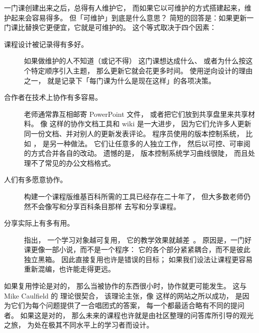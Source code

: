 
一门课创建出来之后，总得有人维护它，
而如果它以可维护的方式搭建起来，维护起来会容易得多。
但「可维护」到底是什么意思？
简短的回答是：如果更新一门课比替换它更便宜，它就是可维护的。
这个等式取决于四个因素：

\begin{description}

\item[课程设计被记录得有多好。]
  如果做维护的人不知道（或记不得）
  这门课想达成什么、
  或者为什么按这个特定顺序引入主题，
  那么更新它就会花更多时间。
  使用逆向设计的理由之一，
  就是记录下「每门课为什么是现在这样」的各项决策。

\item[合作者在技术上协作有多容易。]
  老师通常靠互相邮寄 PowerPoint 文件，
  或者把它们放到共享盘里来共享材料。
  像  这样的协作文档工具和 wiki
  是一大进步，
  因为它们允许多人更新同一份文档、并对别人的更新发表评论。
  程序员使用的版本控制系统，
  比如 ，
  是另一种做法。
  它们让任意多的人独立工作，
  然后以可控、可审阅的方式合并各自的改动。
  遗憾的是，
  版本控制系统学习曲线很陡，
  而且处理不了常见的办公文档格式。

\item[人们有多愿意协作。]
  构建一个课程版维基百科所需的工具已经存在二十年了，
  但大多数老师仍然不会像写和分享百科条目那样
  去写和分享课程。

\item[分享实际上有多有用。]
  指出，
  一个学习对象越可复用，
  它的教学效果就越差~\cite{Wile2002}。
  原因是，一门好课更像一部小说，而不是一个程序：
  它的各个部分紧紧耦合，而不是彼此独立黑箱。
  因此直接复用也许是错误的目标；
  如果我们设法让课程更容易重新混编，也许能走得更远。

\end{description}

如果复用悖论是对的，
那么当被协作的东西很小时，协作就更可能发生。
这与 Mike Caulfield 的
理论很契合，
该理论主张，像  这样的网站之所以成功，
是因为它们为每个问题提供了一合唱团式的答案，
每一个都最适合略有不同的提问者。
如果这是对的，
那么未来的课程也许就是由社区整理的问答库所引导的观光之旅，
为处在极其不同水平上的学习者而设计。

